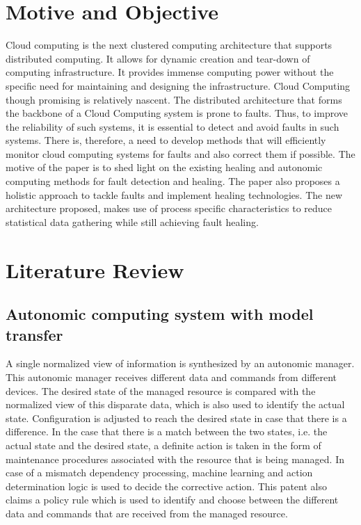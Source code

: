 \documentclass[conference]{IEEEtran}
\begin{document}
\section{Motive and Objective}
Cloud computing is the next clustered computing architecture that supports distributed computing. It allows for dynamic creation and tear-down of computing infrastructure. It provides immense computing power without the specific need for maintaining and designing the infrastructure. Cloud Computing though promising is relatively nascent. The distributed architecture that forms the backbone of a Cloud Computing system is prone to faults. Thus, to improve the reliability of such systems, it is essential to detect and avoid  faults  in such systems. There is, therefore, a need to develop methods that will efficiently monitor cloud computing systems for faults and also correct them if possible. The motive of the paper is to shed light on the existing healing and autonomic computing methods for fault detection and healing. The paper also proposes a holistic approach to tackle faults and implement healing technologies. The new architecture proposed, makes use of process specific characteristics to reduce statistical data gathering while still achieving fault healing.

\section{Literature Review}

\subsection{Autonomic computing system with model transfer}
A single normalized view of information is synthesized by an autonomic manager. This autonomic manager receives different data and commands from different devices.\cite{STRASSNER:2009} The desired state of the managed resource is compared with the normalized view of this disparate data, which is also used to identify the actual state. Configuration is adjusted to reach the desired state in case that there is a difference. In the case that there is a match between the two states, i.e. the  actual state and the desired state, a definite action is taken in the form of maintenance procedures associated with the resource that is being managed. In case of a mismatch dependency processing, machine learning and action determination logic is used to decide the corrective action. This patent also claims a policy rule which is used to identify and choose between the different data and commands that are received from the managed resource.
\end{document}
